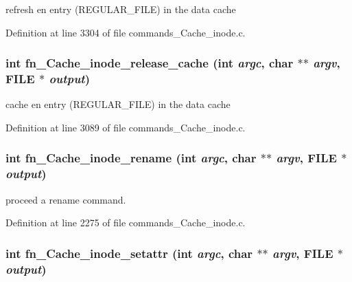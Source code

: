 refresh en entry (REGULAR\_\-FILE) in the data cache 

Definition at line 3304 of file commands\_\-Cache\_\-inode.c.
\subsubsection[{fn\_\-Cache\_\-inode\_\-release\_\-cache}]{\setlength{\rightskip}{0pt plus 5cm}int fn\_\-Cache\_\-inode\_\-release\_\-cache (int {\em argc}, \/  char $\ast$$\ast$ {\em argv}, \/  FILE $\ast$ {\em output})}\label{commands__Cache__inode_8c_203776f9d299bcef300c35f1be807411}


cache en entry (REGULAR\_\-FILE) in the data cache 

Definition at line 3089 of file commands\_\-Cache\_\-inode.c.
\subsubsection[{fn\_\-Cache\_\-inode\_\-rename}]{\setlength{\rightskip}{0pt plus 5cm}int fn\_\-Cache\_\-inode\_\-rename (int {\em argc}, \/  char $\ast$$\ast$ {\em argv}, \/  FILE $\ast$ {\em output})}\label{commands__Cache__inode_8c_616439560ee7cd599d64c3de8b55b36d}


proceed a rename command. 

Definition at line 2275 of file commands\_\-Cache\_\-inode.c.
\subsubsection[{fn\_\-Cache\_\-inode\_\-setattr}]{\setlength{\rightskip}{0pt plus 5cm}int fn\_\-Cache\_\-inode\_\-setattr (int {\em argc}, \/  char $\ast$$\ast$ {\em argv}, \/  FILE $\ast$ {\em output})}\label{commands__Cache__inode_8c_9e606e96829ada43c70f227cd6b9cd52}


